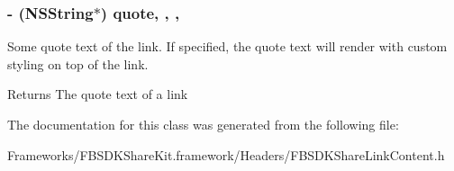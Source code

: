 \subsubsection[{quote}]{\setlength{\rightskip}{0pt plus 5cm}-\/ (N\+S\+String$\ast$) quote\hspace{0.3cm}{\ttfamily [read]}, {\ttfamily [write]}, {\ttfamily [nonatomic]}, {\ttfamily [copy]}}\label{interface_f_b_s_d_k_share_link_content_af2f0d6871f79841514d9631ef65af673}
Some quote text of the link.  If specified, the quote text will render with custom styling on top of the link. \begin{DoxyReturn}{Returns}
The quote text of a link 
\end{DoxyReturn}


The documentation for this class was generated from the following file\+:\begin{DoxyCompactItemize}
\item 
Frameworks/\+F\+B\+S\+D\+K\+Share\+Kit.\+framework/\+Headers/F\+B\+S\+D\+K\+Share\+Link\+Content.\+h\end{DoxyCompactItemize}

